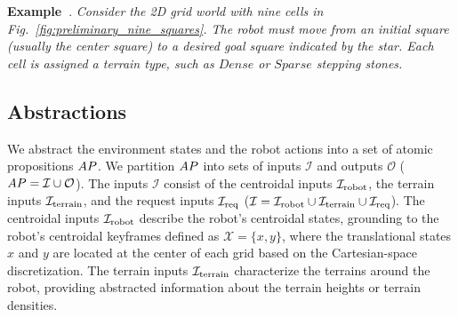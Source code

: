 \documentclass[letterpaper, 10 pt, conference]{ieeeconf}
\begin{document}
\noindent
\textbf{Example~}.
\textit{Consider the 2D grid world with nine cells in Fig.~\ref{fig:preliminary_nine_squares}. The robot must move from an initial square (usually the center square) 
to a desired goal square indicated by the star. 
Each cell is assigned a terrain type, such as $\textit{Dense}$ or $\textit{Sparse}$ stepping stones.}
\subsection{Abstractions}\label{sec:preliminaries_abstraction}
We abstract the environment states and the robot actions into a set of atomic propositions $AP$.
We partition $AP$
into sets of inputs $\mathcal{I}$
and outputs $\mathcal{O}$
($AP = {\mathcal I} \cup {\mathcal O}$).
The inputs $\mathcal{I}$ consist of
the centroidal inputs ${\mathcal I}_{\textrm{robot}}$,
the terrain inputs ${\mathcal I}_{\textrm{terrain}}$,
and the request inputs ${\mathcal I}_{\textrm{req}}$
(${\mathcal I} = {\mathcal I}_{\textrm{robot}} \cup {\mathcal I}_{\textrm{terrain}} \cup {\mathcal I}_{\textrm{req}}$).
The centroidal inputs ${\mathcal I}_{\textrm{robot}}$ describe the robot's centroidal states,
grounding to the robot's centroidal keyframes
defined as $\mathcal{X} = \{x, y\}$, where the translational states $x$ and $y$ are located at the center of each grid based on the Cartesian-space discretization. 
%
The terrain inputs ${\mathcal I}_{\textrm{terrain}}$
characterize the terrains around the robot,
providing abstracted information about the terrain heights
or terrain densities.
\end{document}

